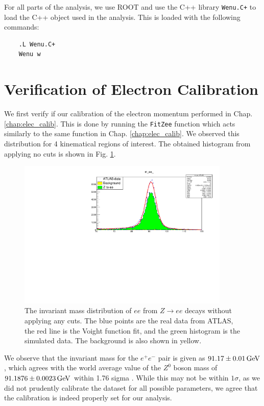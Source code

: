 \documentclass[a4paper]{report}
\numberwithin{equation}{section}
\begin{document}
For all parts of the analysis, we use ROOT and use the C++ library \texttt{Wenu.C+} to load the C++ object used in the analysis. 
This is loaded with the following commands:
\begin{verbatim}
    .L Wenu.C+ 
    Wenu w
\end{verbatim} 


\section{Verification of Electron Calibration}

We first verify if our calibration of the electron momentum performed in Chap. \ref{chap:elec_calib}. This is done by 
running the \texttt{FitZee} function which acts similarly to the same function in Chap. \ref{chap:elec_calib}. We observed 
this distribution for 4 kinematical regions of interest. The obtained histogram from applying no cuts is shown in Fig. \ref{fig:zee_calib}. 

\begin{figure}[htpb]
    \centering
    \includegraphics[width=0.9\textwidth]{zeefit.pdf}
    \caption{The invariant mass distribution of $ee$ from $Z \rightarrow ee$ decays without applying any cuts. The blue points are the 
    real data from ATLAS, the red line is the Voight function fit, and the green histogram is the simulated data. The background 
    is also shown in yellow.}
    \label{fig:zee_calib}
\end{figure}

We observe that the invariant mass for the $e^+ e^-$ pair is given as $\SI{91.17 \pm 0.01}{\giga\electronvolt}$, which agrees with the 
world average value of the $Z^0$ boson mass of $\SI{91.1876 \pm 0.0023}{\giga\electronvolt}$ within 1.76 sigma \cite{ParticleDataGroup:2020ssz}.
While this may not be within $1\sigma$, as we did not prudently calibrate the dataset for all possible parameters, we agree that the 
calibration is indeed properly set for our analysis. \par 
\end{document}
